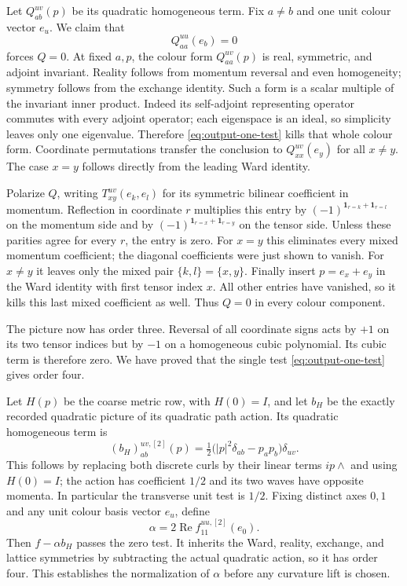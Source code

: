 Let $Q_{ab}^{uv}(p)$ be its quadratic homogeneous term. Fix
$a\ne b$ and one unit colour vector $e_u$. We claim that
\begin{equation}\label{eq:output-one-test}
                      Q_{aa}^{uu}(e_b)=0
\end{equation}
forces $Q=0$. At fixed $a,p$, the colour form
$Q_{aa}^{uv}(p)$ is real, symmetric, and adjoint invariant.
Reality follows from momentum reversal and even homogeneity;
symmetry follows from the exchange identity. Such a form is a
scalar multiple of the invariant inner product. Indeed its
self-adjoint representing operator commutes with every adjoint
operator; each eigenspace is an ideal, so simplicity leaves only
one eigenvalue. Therefore \eqref{eq:output-one-test} kills that
whole colour form. Coordinate permutations transfer the conclusion
to $Q_{xx}^{uv}(e_y)$ for all $x\ne y$. The case $x=y$ follows
directly from the leading Ward identity.

Polarize $Q$, writing $T_{xy}^{uv}(e_k,e_l)$ for its symmetric
bilinear coefficient in momentum. Reflection in coordinate $r$
multiplies this entry by $(-1)^{\mathbf1_{r=k}+\mathbf1_{r=l}}$
on the momentum side and by
$(-1)^{\mathbf1_{r=x}+\mathbf1_{r=y}}$ on the tensor side.
Unless these parities agree for every $r$, the entry is zero.
For $x=y$ this eliminates every mixed momentum coefficient;
the diagonal coefficients were just shown to vanish. For $x\ne y$
it leaves only the mixed pair $\{k,l\}=\{x,y\}$. Finally insert
$p=e_x+e_y$ in the Ward identity with first tensor index $x$.
All other entries have vanished, so it kills this last mixed
coefficient as well. Thus $Q=0$ in every colour component.

The picture now has order three. Reversal of all coordinate signs
acts by $+1$ on its two tensor indices but by $-1$ on a homogeneous
cubic polynomial. Its cubic term is therefore zero. We have proved
that the single test \eqref{eq:output-one-test} gives order four.

Let $H(p)$ be the coarse metric row, with $H(0)=I$, and let $b_H$
be the exactly recorded quadratic picture of its quadratic path
action. Its quadratic homogeneous term is
\[
           (b_H)_{ab}^{uv,[2]}(p)
          =\tfrac12\bigl(|p|^2\delta_{ab}-p_ap_b\bigr)\delta_{uv}.
\]
This follows by replacing both discrete curls by their linear
terms $ip\wedge$ and using $H(0)=I$; the action has coefficient
$1/2$ and its two waves have opposite momenta. In particular the
transverse unit test is $1/2$. Fixing distinct axes $0,1$ and any
unit colour basis vector $e_u$, define
\[
                   \alpha=2\operatorname{Re}f_{11}^{uu,[2]}(e_0).
\]
Then $f-\alpha b_H$ passes the zero test. It inherits the Ward,
reality, exchange, and lattice symmetries by subtracting the
actual quadratic action, so it has order four. This establishes
the normalization of $\alpha$ before any curvature lift is chosen.

